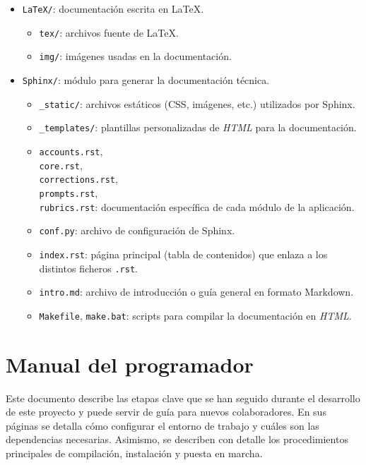\begin{itemize}
    \item \texttt{LaTeX/}: documentación escrita en LaTeX.
    \begin{itemize}
        \item \texttt{tex/}: archivos fuente de LaTeX.
        \item \texttt{img/}: imágenes usadas en la documentación.
    \end{itemize}
    \item \texttt{Sphinx/}: módulo para generar la documentación técnica.
    \begin{itemize}
        \item \texttt{\_static/}: archivos estáticos (CSS, imágenes, etc.) utilizados por Sphinx.
        \item \texttt{\_templates/}: plantillas personalizadas de \textit{HTML} para la documentación.
        \item 
            \texttt{accounts.rst},\\
        \texttt{core.rst},\\
        \texttt{corrections.rst},\\
        \texttt{prompts.rst},\\
        \texttt{rubrics.rst}: documentación específica de cada módulo de la aplicación.
        \item \texttt{conf.py}: archivo de configuración de Sphinx.
        \item \texttt{index.rst}: página principal (tabla de contenidos) que enlaza a los distintos ficheros \texttt{.rst}.
        \item \texttt{intro.md}: archivo de introducción o guía general en formato Markdown.
        \item \texttt{Makefile}, \texttt{make.bat}: scripts para compilar la documentación en \textit{HTML}.
    \end{itemize}
\end{itemize}


\section{Manual del programador}

Este documento describe las etapas clave que se han seguido durante el desarrollo de este proyecto y puede servir de guía para nuevos colaboradores. En sus páginas se detalla cómo configurar el entorno de trabajo y cuáles son las dependencias necesarias. Asimismo, se describen con detalle los procedimientos principales de compilación, instalación y puesta en marcha.

